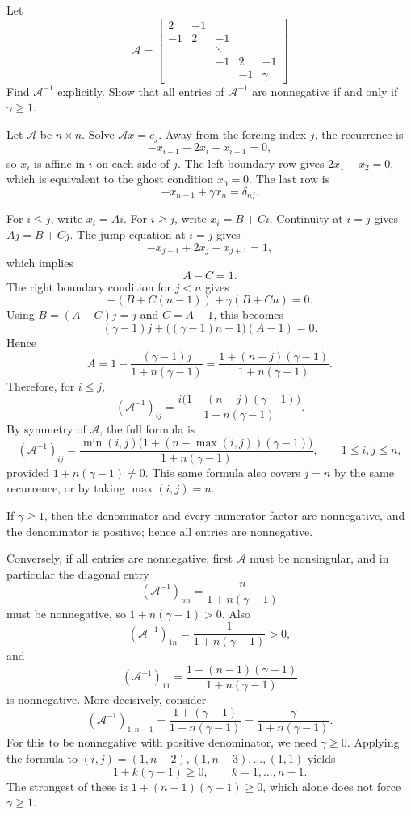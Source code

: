 \begin{exercise}
\label{applied:2017:10}
Let
\[
\mathcal{A} = \begin{bmatrix} 2 & -1 & & & \\ -1 & 2 & -1 & & \\ & & \ddots & & \\ & & -1 & 2 & -1 \\ & & & -1 & \gamma \end{bmatrix}
\]
Find $\mathcal{A}^{-1}$ explicitly. Show that all entries of $\mathcal{A}^{-1}$ are nonnegative if and only if $\gamma \geq 1$.
\end{exercise}

\begin{solution}
Let $\mathcal{A}$ be $n\times n$.  Solve $\mathcal{A}x=e_j$.  Away from the forcing index $j$, the recurrence is
\[
-x_{i-1}+2x_i-x_{i+1}=0,
\]
so $x_i$ is affine in $i$ on each side of $j$.  The left boundary row gives $2x_1-x_2=0$, which is equivalent to the ghost condition $x_0=0$.  The last row is
\[
-x_{n-1}+\gamma x_n=\delta_{nj}.
\]

For $i\leq j$, write $x_i=A i$.  For $i\geq j$, write $x_i=B+C i$.  Continuity at $i=j$ gives $Aj=B+Cj$.  The jump equation at $i=j$ gives
\[
-x_{j-1}+2x_j-x_{j+1}=1,
\]
which implies
\[
A-C=1.
\]
The right boundary condition for $j<n$ gives
\[
-(B+C(n-1))+\gamma(B+Cn)=0.
\]
Using $B=(A-C)j=j$ and $C=A-1$, this becomes
\[
(\gamma-1)j+\bigl((\gamma-1)n+1\bigr)(A-1)=0.
\]
Hence
\[
A=1-\frac{(\gamma-1)j}{1+n(\gamma-1)}
=\frac{1+(n-j)(\gamma-1)}{1+n(\gamma-1)}.
\]
Therefore, for $i\leq j$,
\[
(\mathcal{A}^{-1})_{ij}
=\frac{i\bigl(1+(n-j)(\gamma-1)\bigr)}{1+n(\gamma-1)}.
\]
By symmetry of $\mathcal{A}$, the full formula is
\[
(\mathcal{A}^{-1})_{ij}
=\frac{\min(i,j)\bigl(1+(n-\max(i,j))(\gamma-1)\bigr)}{1+n(\gamma-1)},
\qquad 1\leq i,j\leq n,
\]
provided $1+n(\gamma-1)\neq0$.  This same formula also covers $j=n$ by the same recurrence, or by taking $\max(i,j)=n$.

If $\gamma\geq1$, then the denominator and every numerator factor are nonnegative, and the denominator is positive; hence all entries are nonnegative.

Conversely, if all entries are nonnegative, first $\mathcal{A}$ must be nonsingular, and in particular the diagonal entry
\[
(\mathcal{A}^{-1})_{nn}=\frac{n}{1+n(\gamma-1)}
\]
must be nonnegative, so $1+n(\gamma-1)>0$.  Also
\[
(\mathcal{A}^{-1})_{1n}=\frac{1}{1+n(\gamma-1)}>0,
\]
and
\[
(\mathcal{A}^{-1})_{11}=\frac{1+(n-1)(\gamma-1)}{1+n(\gamma-1)}
\]
is nonnegative.  More decisively, consider
\[
(\mathcal{A}^{-1})_{1,n-1}
=\frac{1+(\gamma-1)}{1+n(\gamma-1)}
=\frac{\gamma}{1+n(\gamma-1)}.
\]
For this to be nonnegative with positive denominator, we need $\gamma\geq0$.  Applying the formula to $(i,j)=(1,n-2),(1,n-3),\dots,(1,1)$ yields
\[
1+k(\gamma-1)\geq0,\qquad k=1,\dots,n-1.
\]
The strongest of these is $1+(n-1)(\gamma-1)\geq0$, which alone does not force $\gamma\geq1$.


\end{solution}
